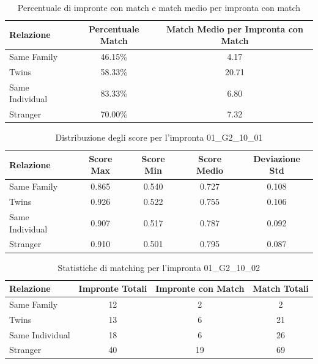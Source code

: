 \begin{table}[htbp]
\centering
\caption{Percentuale di impronte con match e match medio per impronta con match}
\label{tab:match_percentage_01_G2_10_01}
\begin{tabular}{|l|c|c|}
\hline
\textbf{Relazione} & \textbf{Percentuale Match} & \textbf{Match Medio per Impronta con Match} \\
\hline
Same Family & 46.15\% & 4.17 \\
\hline
Twins & 58.33\% & 20.71 \\
\hline
Same Individual & 83.33\% & 6.80 \\
\hline
Stranger & 70.00\% & 7.32 \\
\hline
\end{tabular}
\end{table}


\begin{table}[htbp]
\centering
\caption{Distribuzione degli score per l'impronta 01\_G2\_10\_01}
\label{tab:scores_01_G2_10_01}
\begin{tabular}{|l|c|c|c|c|}
\hline
\textbf{Relazione} & \textbf{Score Max} & \textbf{Score Min} & \textbf{Score Medio} & \textbf{Deviazione Std} \\
\hline
Same Family & 0.865 & 0.540 & 0.727 & 0.108 \\
\hline
Twins & 0.926 & 0.522 & 0.755 & 0.106 \\
\hline
Same Individual & 0.907 & 0.517 & 0.787 & 0.092 \\
\hline
Stranger & 0.910 & 0.501 & 0.795 & 0.087 \\
\hline
\end{tabular}
\end{table}


\begin{table}[htbp]
\centering
\caption{Statistiche di matching per l'impronta 01\_G2\_10\_02}
\label{tab:results_01_G2_10_02}
\begin{tabular}{|l|c|c|c|}
\hline
\textbf{Relazione} & \textbf{Impronte Totali} & \textbf{Impronte con Match} & \textbf{Match Totali} \\
\hline
Same Family & 12 & 2 & 2 \\
\hline
Twins & 13 & 6 & 21 \\
\hline
Same Individual & 18 & 6 & 26 \\
\hline
Stranger & 40 & 19 & 69 \\
\hline
\end{tabular}
\end{table}


